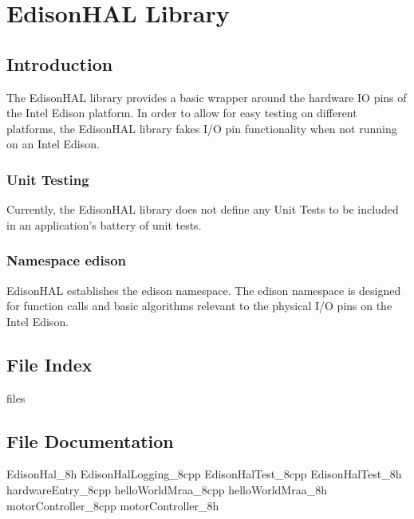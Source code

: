 \part{EdisonHAL Library} \label{sec:edisonhal}

	\chapter{Introduction}

	The EdisonHAL library provides a basic wrapper around the hardware IO pins of the Intel Edison platform.  In order to allow for easy testing on different platforms, the EdisonHAL library fakes I/O pin functionality when not running on an Intel Edison.

		\section{Unit Testing} \label{sec:unit-testing}
		Currently, the EdisonHAL library does not define any Unit Tests to be included in an application's battery of unit tests.
		
		\section{Namespace edison} \label{sec:Namespace}
		EdisonHAL establishes the edison namespace.  The edison namespace is designed for function calls and basic algorithms relevant to the physical I/O pins on the Intel Edison.  
		
		\renewcommand{\DOXYGENFOLDER}{../../EdisonHAL/Documentation/doxygenFiles/latex/}

	\chapter{File Index}
		{files}
	
	\chapter{File Documentation}
	
		{EdisonHal_8h}
		{EdisonHalLogging_8cpp}
		{EdisonHalTest_8cpp}
		{EdisonHalTest_8h}
		{hardwareEntry_8cpp}
		{helloWorldMraa_8cpp}
		{helloWorldMraa_8h}
		{motorController_8cpp}
		{motorController_8h}